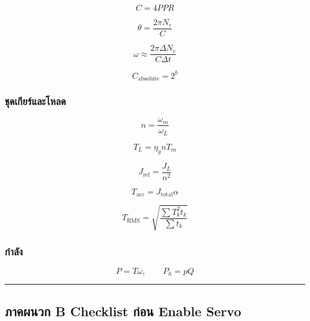 \[
C=4PPR
\]

\[
\theta=\frac{2\pi N_c}{C}
\]

\[
\omega\approx\frac{2\pi\Delta N_c}{C\Delta t}
\]

\[
C_{\text{absolute}}=2^b
\]

\subsubsection{ชุดเกียร์และโหลด}

\[
n=\frac{\omega_m}{\omega_L}
\]

\[
T_L=\eta_gnT_m
\]

\[
J_{\text{ref}}=\frac{J_L}{n^2}
\]

\[
T_{\text{acc}}=J_{\text{total}}\alpha
\]

\[
T_{\text{RMS}}
=
\sqrt{
\frac{\sum T_k^2t_k}{\sum t_k}
}
\]

\subsubsection{กำลัง}

\[
P=T\omega,\qquad P_h=pQ
\]

\par\noindent\rule{\textwidth}{0.4pt}\par

\subsection{ภาคผนวก B Checklist ก่อน Enable Servo}

